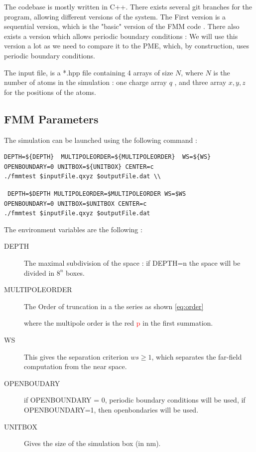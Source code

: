 \documentclass[10pt,twoside,a4paper]{report}
\begin{document}
	The codebase is mostly written in C++.  There exists several git branches for the program, allowing different versions of the system.	
The First version is a sequential version, which is the "basic" version of the FMM code . There also exists a version which allows periodic boundary conditions : We will use this version a lot as we need to compare it to the PME, which, by construction, uses periodic boundary conditions.	

The input file, is a *.hpp file containing 4 arrays of size $N$, where $N$ is the number of atoms in the simulation : one charge array $q$ , and three array $x,y,z$ for the positions of the atoms.

\subsection{FMM Parameters}

The simulation can be launched using the following command : 

\begin{verbatim}
DEPTH=${DEPTH}  MULTIPOLEORDER=${MULTIPOLEORDER}  WS=${WS} 
OPENBOUNDARY=0 UNITBOX=${UNITBOX} CENTER=c 
./fmmtest $inputFile.qxyz $outputFile.dat \\	

\end{verbatim}

{\centering\tt { DEPTH=\${DEPTH}  MULTIPOLEORDER=\${MULTIPOLEORDER}  WS=\${WS} \\ 
OPENBOUNDARY=0 UNITBOX=\${UNITBOX} CENTER=c \\
./fmmtest \$inputFile.qxyz \$outputFile.dat \\					
 }}

The environment variables are the following :

\begin{description}
\item[DEPTH] The maximal subdivision of the space : if DEPTH=n the space will be divided in $8^{n}$ boxes.

\item[MULTIPOLEORDER] The Order of truncation in a the series as shown \ref{eq:order}
	
	where the multipole order is the red \textcolor{red}{p} in the first summation.
	
	
\item[WS] This gives the separation criterion $ws \geq 1$, which separates the far-field computation from the near space.

\item[OPENBOUDARY] if OPENBOUNDARY = 0, periodic boundary conditions will be used, if OPENBOUNDARY=1, then openbondaries will be used.

\item[UNITBOX] Gives the size of the simulation box (in nm).

\end{description}
 	
\end{document}
